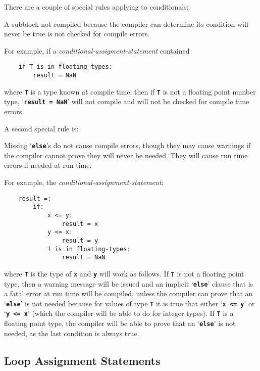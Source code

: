 \documentclass[12pt]{article}
\newcommand{\TT}[1]{{\tt \bfseries #1}}
\newenvironment{indpar}[1][0.3in]%
	{\begin{list}{}%
		     {\setlength{\itemsep}{0in}%
		      \setlength{\topsep}{0in}%
		      \setlength{\parsep}{1ex}%
		      \setlength{\labelwidth}{#1}%
		      \setlength{\leftmargin}{#1}%
		      \addtolength{\leftmargin}{\labelsep}}%
	 \item}%
	{\end{list}}
\begin{document}
There are a couple of special rules applying to conditionals:%
\label{CONDITIONAL-SPECIAL-RULES}

\begin{indpar}
A subblock not compiled because the compiler can determine its
condition will never be true is not checked for compile errors.
\end{indpar}

For example, if a {\em conditional-assigment-statement}
contained
\begin{indpar}\begin{verbatim}
    if T is in floating-types:
        result = NaN
\end{verbatim}\end{indpar}
where \TT{T} is a type known at compile time,
then if \TT{T} is not a floating
point number type, `\TT{result = NaN}' will not compile
and will not be checked for compile time errors.


A second special rule is:

\begin{indpar}
Missing `\TT{else}'s do not cause compile errors, though they
may cause warnings if the compiler cannot prove they will never
be needed.  They will cause run time errors if needed at run time.
\end{indpar}

For example, the {\em conditional-assignment-statement}:
\begin{indpar}\begin{verbatim}
    result =:
        if:
            x <= y:
                result = x
            y <= x:
                result = y
            T is in floating-types:
                result = NaN
\end{verbatim}\end{indpar}
where \TT{T} is the type of \TT{x} and \TT{y} will work as
follows.  If \TT{T} is not a floating point type, then a
warning message will be issued and an implicit `\TT{else}'
clause that is a fatal error at run time will be compiled, unless the
compiler can prove that an `\TT{else}' is not needed because
for values of type \TT{T} it is
true that either `\TT{x~<=~y}' or `\TT{y~<=~x}' (which
the compiler will be able to do for integer types).  If
\TT{T} is a floating point type, the compiler will be able
to prove that an `\TT{else}' is not needed, as the last condition
is always true.


\subsection{Loop Assignment Statements}
\label{LOOP-ASSIGNMENT-STATEMENTS}
\end{document}
